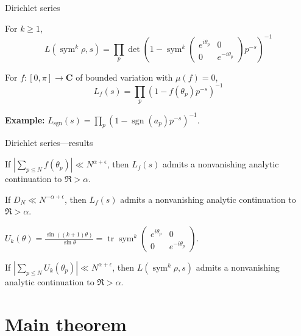 \documentclass[handout]{beamer}
\DeclareMathOperator{\sgn}{sgn}
\DeclareMathOperator{\sym}{sym}
\DeclareMathOperator{\tr}{tr}
\newcommand{\bC}{\mathbf{C}}
\begin{document}
\begin{frame}{Dirichlet series}
\begin{definition}
For $k\geqslant 1$, 
\[
	L(\sym^k \rho,s) = \prod_p \det\left( 1 - \sym^k \begin{pmatrix} e^{i \theta_p} & 0\\ 0 & e^{-i \theta_p}\end{pmatrix} p^{-s}\right)^{-1}
\]
\end{definition}
\pause

\begin{definition}
For $f\colon [0,\pi] \to \bC$ of bounded variation with $\mu(f) = 0$,  
\[
	L_f(s) = \prod_p \left( 1 - f(\theta_p) p^{-s}\right)^{-1}
\]
\end{definition}
\pause

\textbf{Example:} $L_{\sgn}(s) = \prod_p \left(1 - \sgn(a_p) p^{-s}\right)^{-1}$. 
\end{frame}

\begin{frame}{Dirichlet series---results}
\begin{theorem}
If $\left| \sum_{p\leqslant N} f(\theta_p)\right| \ll N^{\alpha+\epsilon}$, 
then $L_f(s)$ admits a nonvanishing analytic continuation to $\Re > \alpha$. 
\end{theorem}
\pause

\begin{corollary}
If $D_N \ll N^{-\alpha+\epsilon}$, then $L_f(s)$ admits a nonvanishing 
analytic continuation to $\Re > \alpha$. 
\end{corollary}
\pause

\begin{definition}
$U_k(\theta) = \frac{\sin((k+1)\theta)}{\sin\theta} = \tr\sym^k \left(\begin{smallmatrix} e^{i \theta_p} & 0\\ 0 & e^{-i \theta_p}\end{smallmatrix}\right)$.
\end{definition}
\pause

\begin{theorem}
If $\left| \sum_{p\leqslant N} U_k(\theta_p)\right| \ll N^{\alpha+\epsilon}$, 
then $L(\sym^k\rho, s)$ admits a nonvanishing analytic continuation to 
$\Re > \alpha$. 
\end{theorem}
\end{frame}





\section{Main theorem}
\end{document}
